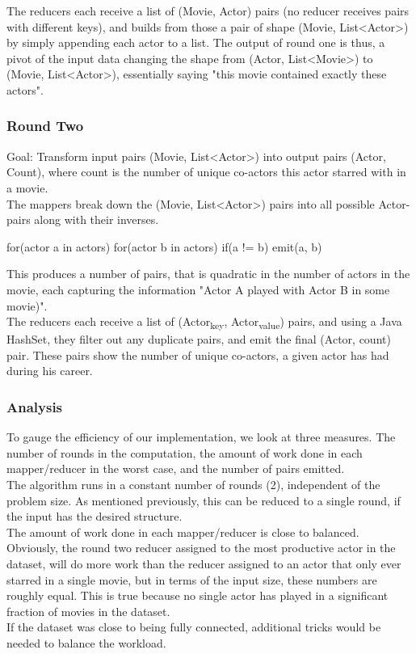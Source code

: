 \documentclass[a4paper,11pt]{article}
\begin{document}
The reducers each receive a list of (Movie, Actor) pairs (no reducer receives pairs with different keys), and builds from those a pair of shape (Movie, List<Actor>) by simply appending each actor to a list. The output of round one is thus, a pivot of the input data changing the shape from (Actor, List<Movie>) to (Movie, List<Actor>), essentially saying "this movie contained exactly these actors".

\subsubsection{Round Two}
\label{sub}
Goal: Transform input pairs (Movie, List<Actor>) into output pairs (Actor, Count), where count is the number of unique co-actors this actor starred with in a movie.\\

The mappers break down the (Movie, List<Actor>) pairs into all possible Actor-pairs along with their inverses.

for(actor a in actors)
	for(actor b in actors)
		if(a != b)
			emit(a, b)

This produces a number of pairs, that is quadratic in the number of actors in the movie, each capturing the information "Actor A played with Actor B in some movie)".\\

The reducers each receive a list of (Actor\textsubscript{key}, Actor\textsubscript{value}) pairs, and using a Java HashSet, they filter out any duplicate pairs, and emit the final (Actor, count) pair. These pairs show the number of unique co-actors, a given actor has had during his career.

\subsubsection{Analysis}
To gauge the efficiency of our implementation, we look at three measures. The number of rounds in the computation, the amount of work done in each mapper/reducer in the worst case, and the number of pairs emitted.\\

The algorithm runs in a constant number of rounds (2), independent of the problem size. As mentioned previously, this can be reduced to a single round, if the input has the desired structure.\\

The amount of work done in each mapper/reducer is close to balanced. Obviously, the round two reducer assigned to the most productive actor in the dataset, will do more work than the reducer assigned to an actor that only ever starred in a single movie, but in terms of the input size, these numbers are roughly equal. This is true because no single actor has played in a significant fraction of movies in the dataset.\\
If the dataset was close to being fully connected, additional tricks would be needed to balance the workload.
\end{document}
